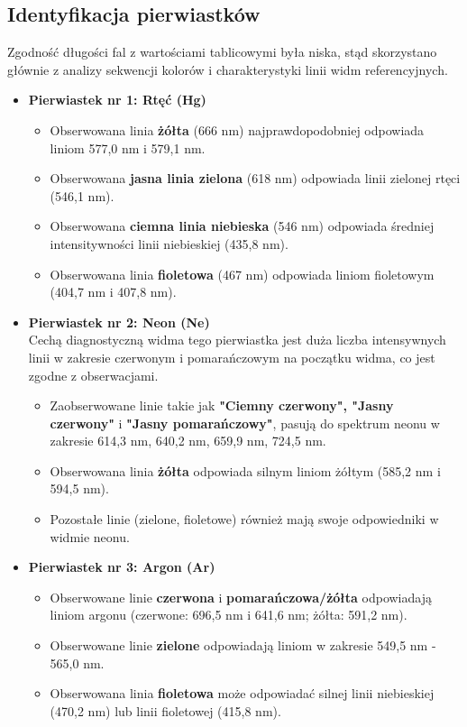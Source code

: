 \documentclass[a4paper,12pt]{article}
\begin{document}
\subsection{Identyfikacja pierwiastków}

Zgodność długości fal z wartościami tablicowymi była niska, stąd skorzystano głównie z analizy sekwencji kolorów i charakterystyki linii widm referencyjnych.

\begin{itemize}
    \item \textbf{Pierwiastek nr 1: Rtęć (Hg)} \\
          \begin{itemize}
              \item Obserwowana linia \textbf{żółta} (666 nm) najprawdopodobniej odpowiada liniom 577,0 nm i 579,1 nm.
              \item Obserwowana \textbf{jasna linia zielona} (618 nm) odpowiada linii zielonej rtęci (546,1 nm).
              \item Obserwowana \textbf{ciemna linia niebieska} (546 nm) odpowiada średniej intensitywności linii niebieskiej (435,8 nm).
              \item Obserwowana linia \textbf{fioletowa} (467 nm) odpowiada liniom fioletowym (404,7 nm i 407,8 nm).
          \end{itemize}

    \item \textbf{Pierwiastek nr 2: Neon (Ne)} \\
          Cechą diagnostyczną widma tego pierwiastka jest duża liczba intensywnych linii w zakresie czerwonym i pomarańczowym na początku widma, co jest zgodne z obserwacjami.
          \begin{itemize}
              \item Zaobserwowane linie takie jak \textbf{"Ciemny czerwony", "Jasny czerwony"} i \textbf{"Jasny pomarańczowy"}, pasują do spektrum neonu w zakresie 614,3 nm, 640,2 nm, 659,9 nm, 724,5 nm.
              \item Obserwowana linia \textbf{żółta} odpowiada silnym liniom żółtym (585,2 nm i 594,5 nm).
              \item Pozostałe linie (zielone, fioletowe) również mają swoje odpowiedniki w widmie neonu.
          \end{itemize}

    \item \textbf{Pierwiastek nr 3: Argon (Ar)} \\
          \begin{itemize}
              \item Obserwowane linie \textbf{czerwona} i \textbf{pomarańczowa/żółta} odpowiadają liniom argonu (czerwone: 696,5 nm i 641,6 nm; żółta: 591,2 nm).
              \item Obserwowane linie \textbf{zielone} odpowiadają liniom w zakresie 549,5 nm - 565,0 nm.
              \item Obserwowana linia \textbf{fioletowa} może odpowiadać silnej linii niebieskiej (470,2 nm) lub linii fioletowej (415,8 nm).
          \end{itemize}
\end{itemize}
\end{document}
